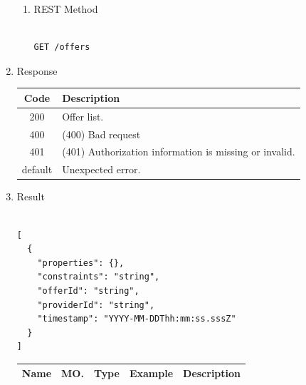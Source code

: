 \begin{enumerate}
\begin{enumerate}


\item REST Method

\begin{tcolorbox}[boxrule=0pt, frame empty]
\begin{verbatim} 

GET /offers

\end{verbatim}
\end{tcolorbox}

\end{enumerate}

\item Response

\begin{table}[H]
\footnotesize

\begin{center}
\begin{tabular}{|c|l|} 
\hline
\rowcolor{lightgray}	Code 		& 	Description \\
\hline
200	 		&	Offer list. \\
\hline
400			&	(400) Bad request \\
\hline
401			&	(401) Authorization information is missing or invalid. \\
\hline
default		&	Unexpected error. \\
\hline
\end{tabular}
\end{center}

\end{table}

\item Result

\begin{tcolorbox}[boxrule=0pt, frame empty]
\begin{verbatim}

[
  {
    "properties": {},
    "constraints": "string",
    "offerId": "string",
    "providerId": "string",
    "timestamp": "YYYY-MM-DDThh:mm:ss.sssZ"
  }
]

\end{verbatim}
\end{tcolorbox}

\begin{table}[H]
\footnotesize

\begin{center}
\begin{tabular}{|p{3cm}|l|p{3cm}|p{3cm}|p{4cm}|} 
\hline
\rowcolor{lightgray}	Name	& MO.	& Type	& Example & 	Description \\
\hline


\end{tabular}
\end{center}
\end{table}
\end{enumerate}
